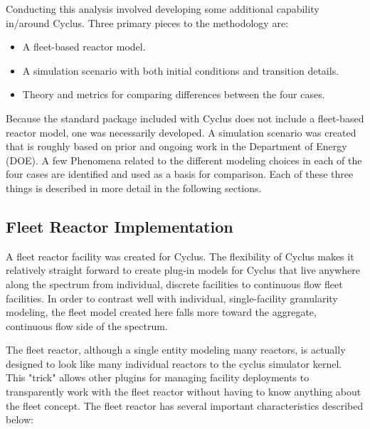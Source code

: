 \documentclass{style}
\begin{document}
Conducting this analysis involved developing some additional capability
in/around Cyclus.  Three primary pieces to the methodology are:

\begin{itemize}

    \item A fleet-based reactor model.

    \item A simulation scenario with both initial conditions and transition
        details.

    \item Theory and metrics for comparing differences between the four cases.

\end{itemize}

Because the standard package included with Cyclus does not include a
fleet-based reactor model, one was necessarily developed. A simulation
scenario was created that is roughly based on prior and ongoing work in the
Department of Energy (DOE).  A few Phenomena related to the different modeling
choices in each of the four cases are identified and used as a basis for
comparison.  Each of these three things is described in more detail in the
following sections.

\subsection{Fleet Reactor Implementation}

A fleet reactor facility was created for Cyclus.  The flexibility of Cyclus
makes it relatively straight forward to create plug-in models for Cyclus that
live anywhere along the spectrum from individual, discrete facilities to
continuous flow fleet facilities.  In order to contrast well with individual,
single-facility granularity modeling, the fleet model created here falls more
toward the aggregate, continuous flow side of the spectrum.  

The fleet reactor, although a single entity modeling many reactors, is
actually designed to look like many individual reactors to the cyclus
simulator kernel. This "trick" allows other plugins for managing facility
deployments to transparently work with the fleet reactor without having to
know anything about the fleet concept.  The fleet reactor has several
important characteristics described below:
\end{document}
